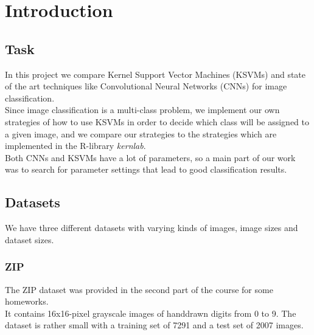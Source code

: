 
\section{Introduction}

\subsection{Task}

In this project we compare Kernel Support Vector Machines (KSVMs) and state of the art techniques
like Convolutional Neural Networks (CNNs) for image classification.\\
Since image classification is a multi-class problem,
we implement our own strategies of how to use KSVMs in order to decide which class
will be assigned to a given image, and we compare our strategies to the strategies
which are implemented in the R-library \textit{kernlab}.\\
Both CNNs and KSVMs have a lot of parameters, so a main part of our work
was to search for parameter settings that lead to good classification results.


\subsection{Datasets}

We have three different datasets with varying kinds of images, image sizes and dataset sizes.


\subsubsection{ZIP}

The ZIP dataset was provided in the second part of the course for some homeworks.\\
It contains 16x16-pixel grayscale images of handdrawn digits from 0 to 9.
The dataset is rather small with a training set of 7291 and a test set of 2007 images.

